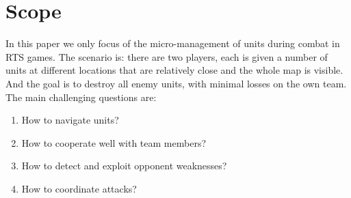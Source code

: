 \section{Scope}
In this paper we only focus of the micro-management of units during combat in RTS games.
The scenario is: there are two players, each is given a number of units at different locations that are relatively close and the whole map is visible. And the goal is to destroy all enemy units, with minimal losses on the own team.
The main challenging questions are:
\begin{enumerate}
        \setlength{\topsep}{0pt}
        \setlength{\partopsep}{0pt}
        \setlength{\itemsep}{0pt}
        \setlength{\parskip}{0pt}
        \setlength{\parsep}{0pt}
    \item How to navigate units? 
    \item How to cooperate well with team members?
    \item How to detect and exploit opponent weaknesses?
    \item How to coordinate attacks?
\end{enumerate}
